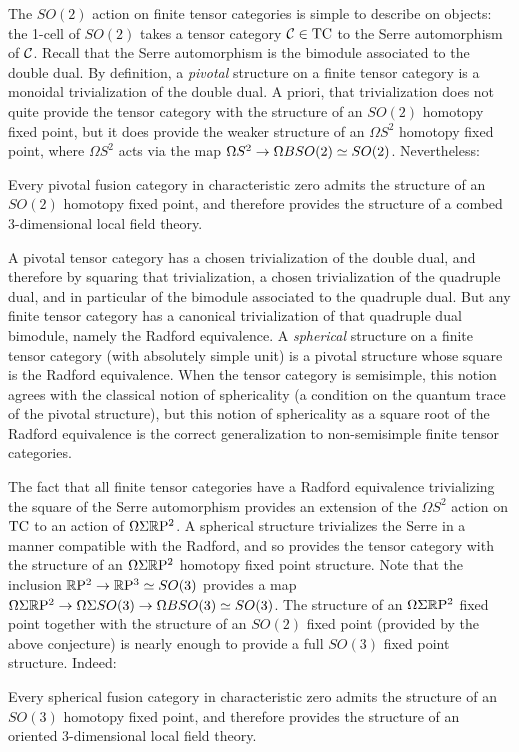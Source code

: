 \documentclass{amsart}
\begin{document}
The $SO(2)$ action on finite tensor categories is simple to describe on objects: the 1-cell of $SO(2)$ takes a tensor category $\mathcal C \in \mathrm{TC}$ to the Serre automorphism of $\mathcal C$.  Recall that the Serre automorphism is the bimodule associated to the double dual.  By definition, a \emph{pivotal} structure on a finite tensor category is a monoidal trivialization of the double dual.  A priori, that trivialization does not quite provide the tensor category with the structure of an $SO(2)$ homotopy fixed point, but it does provide the weaker structure of an $\Omega S^2$ homotopy fixed point, where $\Omega S^2$ acts via the map $\Omega S^2 \rightarrow \Omega BSO(2) \simeq SO(2)$.  Nevertheless:
\begin{mainconj}
Every pivotal fusion category in characteristic zero admits the structure of an $SO(2)$ homotopy fixed point, and therefore provides the structure of a combed 3-dimensional local field theory.
\end{mainconj}

A pivotal tensor category has a chosen trivialization of the double dual, and therefore by squaring that trivialization, a chosen trivialization of the quadruple dual, and in particular of the bimodule associated to the quadruple dual.  But any finite tensor category has a canonical trivialization of that quadruple dual bimodule, namely the Radford equivalence.  A \emph{spherical} structure on a finite tensor category (with absolutely simple unit) is a pivotal structure whose square is the Radford equivalence.  When the tensor category is semisimple, this notion agrees with the classical notion of sphericality (a condition on the quantum trace of the pivotal structure), but this notion of sphericality as a square root of the Radford equivalence is the correct generalization to non-semisimple finite tensor categories.  

The fact that all finite tensor categories have a Radford equivalence trivializing the square of the Serre automorphism provides an extension of the $\Omega S^2$ action on $\mathrm{TC}$ to an action of $\Omega \Sigma \mathbb R \mathrm{P}^2$.  A spherical structure trivializes the Serre in a manner compatible with the Radford, and so provides the tensor category with the structure of an $\Omega \Sigma \mathbb R \mathrm{P}^2$ homotopy fixed point structure.  Note that the inclusion $\mathbb R \mathrm{P}^2 \rightarrow \mathbb R \mathrm{P}^3 \simeq SO(3)$ provides a map $\Omega \Sigma \mathbb R \mathrm{P}^2 \rightarrow \Omega \Sigma SO(3) \rightarrow \Omega B SO(3) \simeq SO(3)$.  The structure of an $\Omega \Sigma \mathbb R \mathrm{P}^2$ fixed point together with the structure of an $SO(2)$ fixed point (provided by the above conjecture) is nearly enough to provide a full $SO(3)$ fixed point structure.  Indeed:
\begin{mainconj}
Every spherical fusion category in characteristic zero admits the structure of an $SO(3)$ homotopy fixed point, and therefore provides the structure of an oriented 3-dimensional local field theory.
\end{mainconj}
\end{document}

